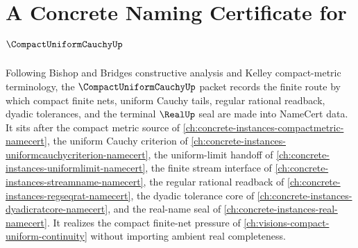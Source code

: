 \chapter{A Concrete Naming Certificate for $\CompactUniformCauchyUp$}
\label{ch:concrete-instances-compact-uniform-cauchy-namecert}

Following Bishop and Bridges constructive analysis and Kelley compact-metric terminology, the $\CompactUniformCauchyUp$ packet records the finite route by which compact finite nets, uniform Cauchy tails, regular rational readback, dyadic tolerances, and the terminal $\RealUp$ seal are made into NameCert data. It sits after the compact metric source of \autoref{ch:concrete-instances-compactmetric-namecert}, the uniform Cauchy criterion of \autoref{ch:concrete-instances-uniformcauchycriterion-namecert}, the uniform-limit handoff of \autoref{ch:concrete-instances-uniformlimit-namecert}, the finite stream interface of \autoref{ch:concrete-instances-streamname-namecert}, the regular rational readback of \autoref{ch:concrete-instances-regseqrat-namecert}, the dyadic tolerance core of \autoref{ch:concrete-instances-dyadicratcore-namecert}, and the real-name seal of \autoref{ch:concrete-instances-real-namecert}. It realizes the compact finite-net pressure of \autoref{ch:visions-compact-uniform-continuity} without importing ambient real completeness.

